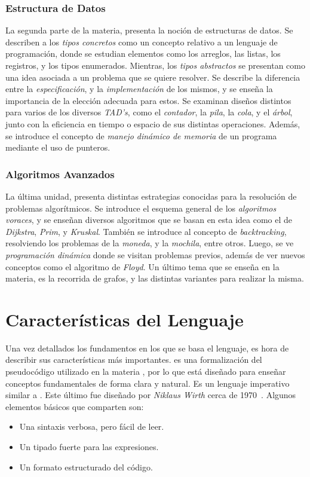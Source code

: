 \subsubsection{Estructura de Datos}

La segunda parte de la materia, presenta la noción de estructuras de datos.
Se describen a los \textit{tipos concretos} como un concepto relativo a un lenguaje de programación, donde se estudian elementos como los arreglos, las listas, los registros, y los tipos enumerados.
Mientras, los \textit{tipos abstractos} se presentan como una idea asociada a un problema que se quiere resolver.
Se describe la diferencia entre la \textit{especificación}, y la \textit{implementación} de los mismos, y se enseña la importancia de la elección adecuada para estos.
Se examinan diseños distintos para varios de los diversos \textit{TAD's}, como el \textit{contador}, la \textit{pila}, la \textit{cola}, y el \textit{árbol}, junto con la eficiencia en tiempo o espacio de sus distintas operaciones.
Además, se introduce el concepto de \textit{manejo dinámico de memoria} de un programa mediante el uso de punteros.

\subsubsection{Algoritmos Avanzados}

La última unidad, presenta distintas estrategias conocidas para la resolución de problemas algorítmicos.
Se introduce el esquema general de los \textit{algoritmos voraces}, y se enseñan diversos algoritmos que se basan en esta idea como el de \textit{Dijkstra}, \textit{Prim}, y \textit{Kruskal}.
También se introduce al concepto de \textit{backtracking}, resolviendo los problemas de la \textit{moneda}, y la \textit{mochila}, entre otros.
Luego, se ve \textit{programación dinámica} donde se visitan problemas previos, además de ver nuevos conceptos como el algoritmo de \textit{Floyd}.
Un último tema que se enseña en la materia, es la recorrida de grafos, y las distintas variantes para realizar la misma.

\section{Características del Lenguaje}

Una vez detallados los fundamentos en los que se basa el lenguaje, es hora de describir sus características más importantes.
\Lenguaje{} es una formalización del pseudocódigo utilizado en la materia \Materia{}, por lo que está diseñado para enseñar conceptos fundamentales de forma clara y natural.
Es un lenguaje imperativo similar a \Pascal{}.
Este último fue diseñado por \textit{Niklaus Wirth} cerca de 1970~\cite{Pascal}.
Algunos elementos básicos que comparten son:
\begin{itemize}
    \item Una sintaxis verbosa, pero fácil de leer.
    \item Un tipado fuerte para las expresiones.
    \item Un formato estructurado del código.
\end{itemize}

